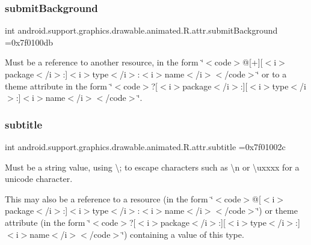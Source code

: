 \subsubsection{\texorpdfstring{submit\+Background}{submitBackground}}
{\footnotesize\ttfamily int android.\+support.\+graphics.\+drawable.\+animated.\+R.\+attr.\+submit\+Background =0x7f0100db\hspace{0.3cm}{\ttfamily [static]}}

Must be a reference to another resource, in the form \char`\"{}$<$code$>$@\mbox{[}+\mbox{]}\mbox{[}$<$i$>$package$<$/i$>$\+:\mbox{]}$<$i$>$type$<$/i$>$\+:$<$i$>$name$<$/i$>$$<$/code$>$\char`\"{} or to a theme attribute in the form \char`\"{}$<$code$>$?\mbox{[}$<$i$>$package$<$/i$>$\+:\mbox{]}\mbox{[}$<$i$>$type$<$/i$>$\+:\mbox{]}$<$i$>$name$<$/i$>$$<$/code$>$\char`\"{}. \mbox{\label{classandroid_1_1support_1_1graphics_1_1drawable_1_1animated_1_1R_1_1attr_a2192a91653ec955f060009b3c526ce38}} 
\subsubsection{\texorpdfstring{subtitle}{subtitle}}
{\footnotesize\ttfamily int android.\+support.\+graphics.\+drawable.\+animated.\+R.\+attr.\+subtitle =0x7f01002c\hspace{0.3cm}{\ttfamily [static]}}

Must be a string value, using \textquotesingle{}\textbackslash{};\textquotesingle{} to escape characters such as \textquotesingle{}\textbackslash{}n\textquotesingle{} or \textquotesingle{}\textbackslash{}uxxxx\textquotesingle{} for a unicode character. 

This may also be a reference to a resource (in the form \char`\"{}$<$code$>$@\mbox{[}$<$i$>$package$<$/i$>$\+:\mbox{]}$<$i$>$type$<$/i$>$\+:$<$i$>$name$<$/i$>$$<$/code$>$\char`\"{}) or theme attribute (in the form \char`\"{}$<$code$>$?\mbox{[}$<$i$>$package$<$/i$>$\+:\mbox{]}\mbox{[}$<$i$>$type$<$/i$>$\+:\mbox{]}$<$i$>$name$<$/i$>$$<$/code$>$\char`\"{}) containing a value of this type. \mbox{\label{classandroid_1_1support_1_1graphics_1_1drawable_1_1animated_1_1R_1_1attr_a680ed757d4c7049e04b519856ba8a9be}} 
